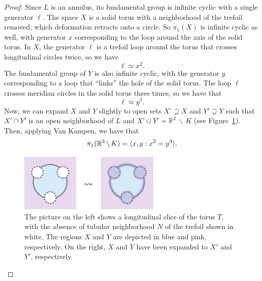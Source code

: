 \documentclass[12pt,twoside]{reedthesis}
\theoremstyle{definition}
\newcommand{\R}{\mathbb{R}}
\newcommand{\wo}{\, \backslash \,}
\DeclarePairedDelimiter\ang{\langle}{\rangle}
\begin{document}
\begin{proof}
  Since $L$ is an annulus, its fundamental group is infinite cyclic with a single generator $\ell$.
  The space $X$ is a solid torus with a neighborhood of the trefoil removed, which deformation retracts onto a circle.
  So $\pi_1(X)$ is infinite cyclic as well, with generator $x$ corresponding to the loop around the axis of the solid torus.
  In $X$, the generator $\ell$ is a trefoil loop around the torus that crosses longitudinal circles twice, so we have
  \begin{equation*}
    \ell \simeq x^2.
  \end{equation*}
  The fundamental group of $Y$ is also infinite cyclic, with the generator $y$ corresponding to a loop that ``links'' the hole of the solid torus.
  The loop $\ell$ crosses meridian circles in the solid torus three times, so we have that
  \begin{equation*}
    \ell \simeq y^3.
  \end{equation*}
  Now, we can expand $X$ and $Y$ slightly to open sets $X' \supseteq X$ and $Y' \supseteq Y$ such that $X' \cap Y'$ is an open neighborhood of $L$ and $X' \cup Y' = \R^3 \wo K$ (see Figure~\ref{fig:fundamental_group_side}).
  Then, applying Van Kampen, we have that
  \begin{equation*}
    \pi_1(\R^3 \wo K) = \ang{x, y : x^2 = y^3}.
  \end{equation*}

  \begin{figure}[t]
    \centering
    \includegraphics[width=0.6\textwidth]{figures/fundamental_group_side.pdf}
    \caption{The picture on the left shows a longitudinal slice of the torus $T$, with the absence of tubular neighborhood $N$ of the trefoil shown in white. The regions $X$ and $Y$ are depicted in blue and pink, respectively. On the right, $X$ and $Y$ have been expanded to $X'$ and $Y'$, respectively.}
    \label{fig:fundamental_group_side}
  \end{figure}


\end{proof}
\end{document}
